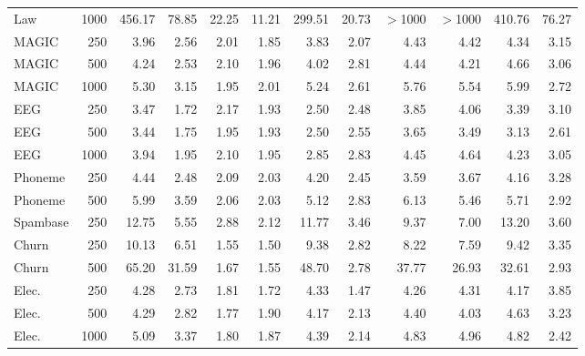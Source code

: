 \documentclass[pdflatex,sn-mathphys-num,iicol]{sn-jnl}
\theoremstyle{thmstyleone}
\theoremstyle{thmstyletwo}
\theoremstyle{thmstylethree}
\begin{document}
\begin{table}[t]
\begin{tabular}{lrrrrrrrrrrr}
Law & 1000 & 456.17 & 78.85 & 22.25 & 11.21 & 299.51 & 20.73 & $>$1000 & $>$1000 & 410.76 & 76.27 \\
MAGIC & 250 & 3.96 & 2.56 & 2.01 & 1.85 & 3.83 & 2.07 & 4.43 & 4.42 & 4.34 & 3.15 \\
MAGIC & 500 & 4.24 & 2.53 & 2.10 & 1.96 & 4.02 & 2.81 & 4.44 & 4.21 & 4.66 & 3.06 \\
MAGIC & 1000 & 5.30 & 3.15 & 1.95 & 2.01 & 5.24 & 2.61 & 5.76 & 5.54 & 5.99 & 2.72 \\
EEG & 250 & 3.47 & 1.72 & 2.17 & 1.93 & 2.50 & 2.48 & 3.85 & 4.06 & 3.39 & 3.10 \\
EEG & 500 & 3.44 & 1.75 & 1.95 & 1.93 & 2.50 & 2.55 & 3.65 & 3.49 & 3.13 & 2.61 \\
EEG & 1000 & 3.94 & 1.95 & 2.10 & 1.95 & 2.85 & 2.83 & 4.45 & 4.64 & 4.23 & 3.05 \\
Phoneme & 250 & 4.44 & 2.48 & 2.09 & 2.03 & 4.20 & 2.45 & 3.59 & 3.67 & 4.16 & 3.28 \\
Phoneme & 500 & 5.99 & 3.59 & 2.06 & 2.03 & 5.12 & 2.83 & 6.13 & 5.46 & 5.71 & 2.92 \\
Spambase & 250 & 12.75 & 5.55 & 2.88 & 2.12 & 11.77 & 3.46 & 9.37 & 7.00 & 13.20 & 3.60 \\
Churn & 250 & 10.13 & 6.51 & 1.55 & 1.50 & 9.38 & 2.82 & 8.22 & 7.59 & 9.42 & 3.35 \\
Churn & 500 & 65.20 & 31.59 & 1.67 & 1.55 & 48.70 & 2.78 & 37.77 & 26.93 & 32.61 & 2.93 \\
Elec. & 250 & 4.28 & 2.73 & 1.81 & 1.72 & 4.33 & 1.47 & 4.26 & 4.31 & 4.17 & 3.85 \\
Elec. & 500 & 4.29 & 2.82 & 1.77 & 1.90 & 4.17 & 2.13 & 4.40 & 4.03 & 4.63 & 3.23 \\
Elec. & 1000 & 5.09 & 3.37 & 1.80 & 1.87 & 4.39 & 2.14 & 4.83 & 4.96 & 4.82 & 2.42 \\
\bottomrule
\end{tabular}

\end{table}
\end{document}
